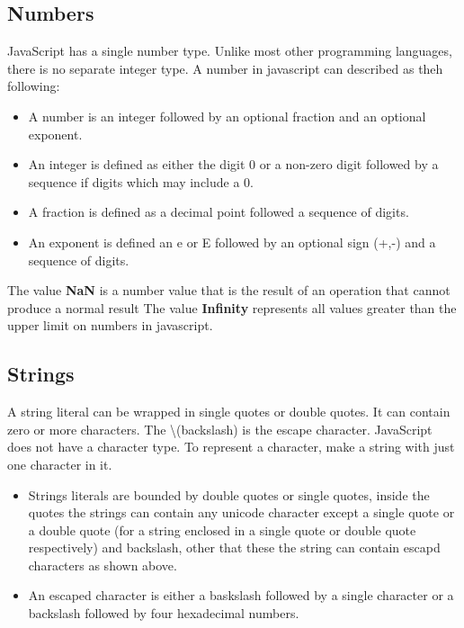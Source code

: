 \documentclass[12pt]{article}
\begin{document}
\subsection{Numbers}
JavaScript has a single number type. Unlike most other programming languages, there is
no separate integer type. A number in javascript can described as theh following:
\begin{itemize}
\item A number is an integer followed by an optional fraction and an optional exponent.
\item An integer is defined as either the digit 0 or a non-zero digit followed by a sequence if digits which may include a 0.
\item A fraction is defined as a decimal point followed a sequence of digits.
\item An exponent is defined an e or E followed by an optional sign (+,-) and a sequence of digits.
\end{itemize}
The value \textbf{NaN} is a number value that is the result of an operation that cannot produce a normal result
The value \textbf{Infinity} represents all values greater than the upper limit on numbers in javascript.
\subsection{Strings}
A string literal can be wrapped in single quotes or double quotes. It can contain zero
or more characters. The \textbackslash (backslash) is the escape character. JavaScript does not have a character type. To represent a character, make a string with just one character in it.
\begin{itemize}
\item Strings literals are bounded by double quotes or single quotes, inside the quotes the strings can contain any unicode character except a single quote or a double quote (for a string enclosed in a single quote or double quote respectively) and backslash, other that these the string can contain escapd characters as shown above.
\item An escaped character is either a baskslash followed by a single character or a backslash followed by four hexadecimal numbers.
\end{itemize}
\end{document}

